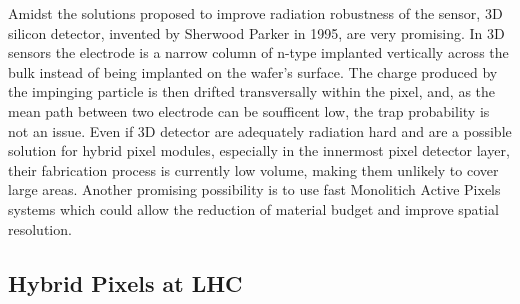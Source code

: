     Amidst the solutions proposed to improve radiation robustness of the sensor, 3D silicon detector, invented by Sherwood Parker in 1995, are very promising.
    In 3D sensors the electrode is a narrow column of n-type implanted vertically across the bulk instead of being implanted on the wafer's surface. 
    The charge produced by the impinging particle is then drifted transversally within the pixel, and, as the mean path between two electrode can be soufficent low, the trap probability is not an issue. 
    Even if 3D detector are adequately radiation hard and are a possible solution for hybrid pixel modules, especially in the innermost pixel detector layer, their fabrication process is currently low volume, making them unlikely to cover large areas.
    Another promising possibility is to use fast Monolitich Active Pixels systems which could allow the reduction of material budget and improve spatial resolution.


    \subsection{Hybrid Pixels at LHC}
